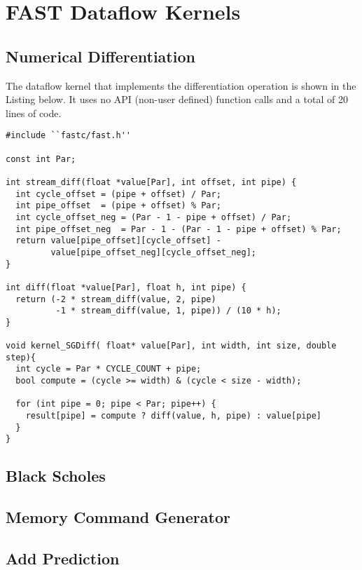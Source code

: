 \chapter{FAST Dataflow Kernels}

\section{Numerical Differentiation}

\label{app:numdiff}

The \FAST{} dataflow kernel that implements the differentiation
operation is shown in the Listing below. It uses no API (non-user
defined) function calls and a total of 20 lines of code.

\begin{lstlisting}
#include ``fastc/fast.h''

const int Par;

int stream_diff(float *value[Par], int offset, int pipe) {
  int cycle_offset = (pipe + offset) / Par;
  int pipe_offset  = (pipe + offset) % Par;
  int cycle_offset_neg = (Par - 1 - pipe + offset) / Par;
  int pipe_offset_neg  = Par - 1 - (Par - 1 - pipe + offset) % Par;
  return value[pipe_offset][cycle_offset] -
         value[pipe_offset_neg][cycle_offset_neg];
}

int diff(float *value[Par], float h, int pipe) {
  return (-2 * stream_diff(value, 2, pipe)
          -1 * stream_diff(value, 1, pipe)) / (10 * h);
}

void kernel_SGDiff( float* value[Par], int width, int size, double step){
  int cycle = Par * CYCLE_COUNT + pipe;
  bool compute = (cycle >= width) & (cycle < size - width);

  for (int pipe = 0; pipe < Par; pipe++) {
    result[pipe] = compute ? diff(value, h, pipe) : value[pipe]
  }
}
\end{lstlisting}

\section{Black Scholes}

\label{app:bscholes}

\section{Memory Command Generator}

\label{app:mem-read}

\section{Add Prediction}